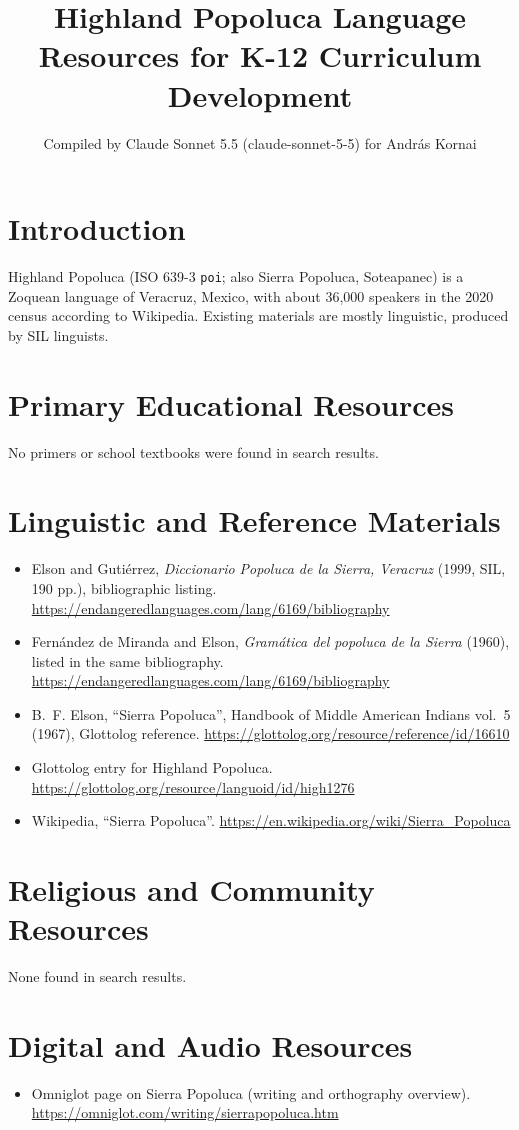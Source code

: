 \documentclass[12pt]{article}
\title{Highland Popoluca Language Resources for K-12 Curriculum Development}
\author{Compiled by Claude Sonnet 5.5 (claude-sonnet-5-5) for Andr\'as Kornai}
\date{}
\begin{document}
\maketitle

\section{Introduction}
Highland Popoluca (ISO 639-3 \texttt{poi}; also Sierra Popoluca, Soteapanec) is a Zoquean language of Veracruz, Mexico, with about 36,000 speakers in the 2020 census according to Wikipedia. Existing materials are mostly linguistic, produced by SIL linguists.

\section{Primary Educational Resources}
No primers or school textbooks were found in search results.

\section{Linguistic and Reference Materials}
\begin{itemize}
\item Elson and Guti\'errez, \emph{Diccionario Popoluca de la Sierra, Veracruz} (1999, SIL, 190 pp.), bibliographic listing. \url{https://endangeredlanguages.com/lang/6169/bibliography}
\item Fern\'andez de Miranda and Elson, \emph{Gram\'atica del popoluca de la Sierra} (1960), listed in the same bibliography. \url{https://endangeredlanguages.com/lang/6169/bibliography}
\item B.~F. Elson, ``Sierra Popoluca'', Handbook of Middle American Indians vol.~5 (1967), Glottolog reference. \url{https://glottolog.org/resource/reference/id/16610}
\item Glottolog entry for Highland Popoluca. \url{https://glottolog.org/resource/languoid/id/high1276}
\item Wikipedia, ``Sierra Popoluca''. \url{https://en.wikipedia.org/wiki/Sierra_Popoluca}
\end{itemize}

\section{Religious and Community Resources}
None found in search results.

\section{Digital and Audio Resources}
\begin{itemize}
\item Omniglot page on Sierra Popoluca (writing and orthography overview). \url{https://omniglot.com/writing/sierrapopoluca.htm}
\end{itemize}
\end{document}
